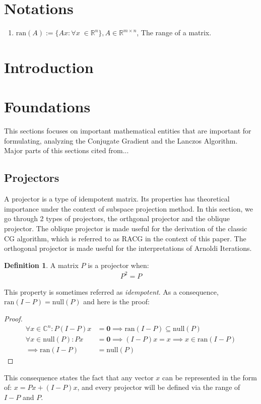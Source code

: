 \documentclass[]{article}
\theoremstyle{definition}
\newtheorem{definition}{Definition}
\begin{document}
\tableofcontents
\newpage
\section*{Notations}
\begin{enumerate}
    \item $\text{ran}(A):=\{Ax :\forall x \; \in \mathbb R^n\}, A \in \mathbb R^{m\times n}$, The range of a matrix. 
\end{enumerate}
\section*{Introduction}
\newpage
\section{Foundations}
    This sections focuses on important mathematical entities that are important for formulating, analyzing the Conjugate Gradient and the Lanczos Algorithm. Major parts of this sections cited from... 

    \subsection{Projectors}
        A projector is a type of idempotent matrix. Its properties has theoretical importance under the context of subspace projection method. In this section, we go through 2 types of projectors, the orthgonal projector and the oblique projector. The oblique projector is made useful for the derivation of the classic CG algorithm, which is referred to as RACG in the context of this paper. The orthogonal projector is made useful for the interpretations of Arnoldi Iterations. 
        \begin{definition}
            A matrix $P$ is a projector when: 
            \begin{align}
                P^2 = P
            \end{align}    
        \end{definition}
        
        This property is sometimes referred as \textit{idempotent}. As a consequence, $\text{ran}(I - P) = \text{null}(P)$ and here is the proof: 
        \begin{proof}
            \begin{align}
                \forall x \in \mathbb{C}^n: P(I - P)x &= \mathbf{0} \implies \text{ran}(I - P)\subseteq \text{null}(P)
                \\
                \forall x \in \text{null}(P): Px &= \mathbf{0} \implies (I - P)x = x \implies x \in \text{ran}(I - P)
                \\
                \implies \text{ran}(I - P) &= \text{null}(P)
                \label{a:1.1.4}
            \end{align}
        \end{proof}
        \noindent
        This consequence states the fact that any vector $x$ can be represented in the form of: $x = Px + (I - P)x$, and every projector will be defined via the range of $I - P$ and $P$. 
        
\end{document}
